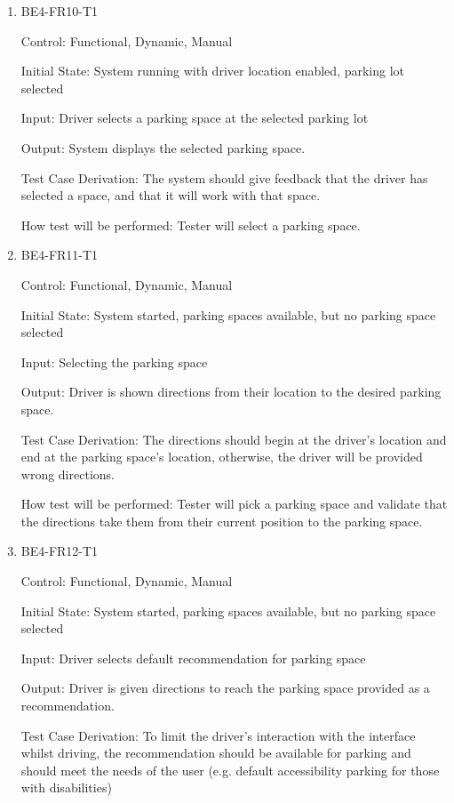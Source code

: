 \documentclass[12pt, titlepage]{article}
\begin{document}
\begin{enumerate}

\item{BE4-FR10-T1}

Control: Functional, Dynamic, Manual
					
Initial State: System running with driver location enabled, parking lot selected
					
Input: Driver selects a parking space at the selected parking lot
					
Output: System displays the selected parking space.

Test Case Derivation: The system should give feedback that the driver has
selected a space, and that it will work with that space.
					
How test will be performed: Tester will select a parking space.

\item{BE4-FR11-T1}

Control: Functional, Dynamic, Manual
					
Initial State: System started, parking spaces available, but no parking space
selected
					
Input: Selecting the parking space
					
Output: Driver is shown directions from their location to the desired parking
space.

Test Case Derivation: The directions should begin at the driver's location and
end at the parking space's location, otherwise, the driver will be provided
wrong directions.
					
How test will be performed: Tester will pick a parking space and validate that
the directions take them from their current position to the parking space.

\item{BE4-FR12-T1}

Control: Functional, Dynamic, Manual
					
Initial State: System started, parking spaces available, but no parking space
selected
					
Input: Driver selects default recommendation for parking space
					
Output: Driver is given directions to reach the parking space provided as a
recommendation.

Test Case Derivation: To limit the driver's interaction with the interface
whilst driving, the recommendation should be available for parking and should
meet the needs of the user (e.g. default accessibility parking for those with
disabilities)
					

\end{enumerate}
\end{document}
